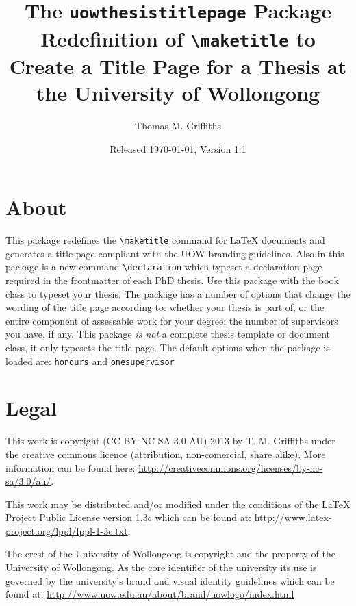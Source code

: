 \documentclass[12pt,oneside]{article}
\newcommand{\oporcom}[1]{\texttt{\color{RoyalBlue}#1}} %
\begin{document}
    
\title{\textbf{The \texttt{uowthesistitlepage} Package\\
Redefinition of \texttt{\textbackslash{}maketitle} to Create a Title Page for a Thesis at the University of Wollongong}}
\author{Thomas M. Griffiths}
\date{Released \today, Version 1.1}

\maketitle

\tableofcontents

\section{About}
This package redefines the \oporcom{\textbackslash{}maketitle} command for LaTeX documents and generates a title page compliant with the UOW branding guidelines. Also in this package is a new command \oporcom{\textbackslash{}declaration} which typeset a declaration page required in the frontmatter of each PhD thesis. Use this package with the book class to typeset your thesis. The package has a number of options that change the wording of the title page according to: whether your thesis is part of, or the entire component of assessable work for your degree; the number of supervisors you have, if any. This package \emph{is not} a complete thesis template or document class, it only typesets the title page. The default options when the package is loaded are: \oporcom{honours} and \oporcom{onesupervisor}

\section{Legal}
This work is copyright (CC BY-NC-SA 3.0 AU) 2013 by T. M. Griffiths under the creative commons licence (attribution, non-comercial, share alike). More information can be found here: \url{http://creativecommons.org/licenses/by-nc-sa/3.0/au/}. 

This work may be distributed and/or modified under the conditions of the LaTeX Project Public License version 1.3c which can be found at: \url{http://www.latex-project.org/lppl/lppl-1-3c.txt}.

The crest of the University of Wollongong is copyright and the property of the University of Wollongong. As the core identifier of the university its use is governed by the university's brand and visual identity guidelines which can be found at: \url{http://www.uow.edu.au/about/brand/uowlogo/index.html}
\end{document}
